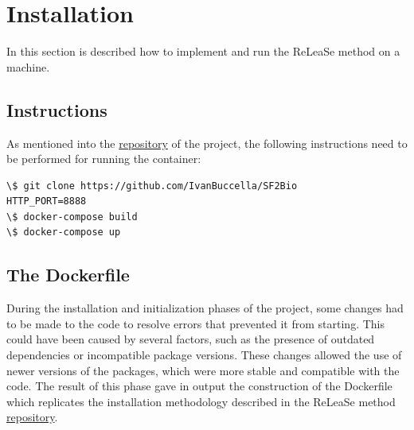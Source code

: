 \documentclass[a4paper]{article}
\begin{document}
\section{Installation}\label{sec:Installation}

In this section is described how to implement and run the ReLeaSe method on a machine.

\subsection{Instructions}\label{sec:Instructions}

As mentioned into the \href{https://github.com/IvanBuccella/SF2Bio#installation}{repository} of the project, the following instructions need to be performed for running the container:

\begin{lstlisting}
\$ git clone https://github.com/IvanBuccella/SF2Bio
HTTP_PORT=8888
\$ docker-compose build
\$ docker-compose up
\end{lstlisting}

\subsection{The Dockerfile}\label{sec:The Dockerfile}

During the installation and initialization phases of the project, some changes had to be made to the code to resolve errors that prevented it from starting. This could have been caused by several factors, such as the presence of outdated dependencies or incompatible package versions. These changes allowed the use of newer versions of the packages, which were more stable and compatible with the code. 
The result of this phase gave in output the construction of the Dockerfile which replicates the installation methodology described in the ReLeaSe method \href{https://github.com/isayev/ReLeaSE#installation-with-anaconda}{repository}. 
\end{document}
